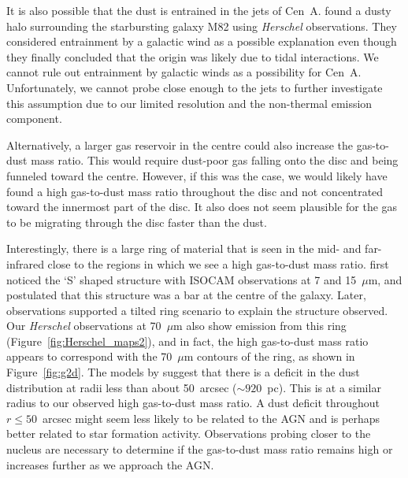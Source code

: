 It is also possible that the dust is entrained in the jets of Cen~A.  \citet{2010A&A...518L..66R} found a dusty halo surrounding the starbursting galaxy M82 using \emph{Herschel} observations.  They considered entrainment by a galactic wind as a possible explanation even though they finally concluded that the origin was likely due to tidal interactions.  We cannot rule out entrainment by galactic winds as a possibility for Cen~A.  Unfortunately, we cannot probe close enough to the jets to further investigate this assumption due to our limited resolution and the non-thermal emission component.

Alternatively, a larger gas reservoir in the centre could also increase the gas-to-dust mass ratio.  This would require dust-poor gas falling onto the disc and being funneled toward the centre.  However, if this was the case, we would likely have found a high gas-to-dust mass ratio throughout the disc and not concentrated toward the innermost part of the disc.  It also does not seem plausible for the gas to be migrating through the disc faster than the dust.

Interestingly, there is a large ring of material that is seen in the mid- and far-infrared close to the regions in which we see a high gas-to-dust mass ratio.  \citet{1999A&A...341..667M} first noticed the `S' shaped structure with ISOCAM observations at 7 and 15~$\mu$m, and postulated that this structure was a bar at the centre of the galaxy.  Later, observations \citep{2002ApJ...565..131L,2006ApJ...645.1092Q} supported a tilted ring scenario to explain the structure observed.  Our \emph{Herschel} observations at 70~$\mu$m also show emission from this ring (Figure~\ref{fig:Herschel_maps2}), and in fact, the high gas-to-dust mass ratio appears to correspond with the 70~$\mu$m contours of the ring, as shown in Figure~\ref{fig:g2d}.  The models by \citet{2006ApJ...645.1092Q} suggest that there is a deficit in the dust distribution at radii less than about 50~arcsec ($\sim 920$~pc).  This is at a similar radius to our observed high gas-to-dust mass ratio.  A dust deficit throughout $r \le 50$~arcsec might seem less likely to be related to the AGN and is perhaps better related to star formation activity.  Observations probing closer to the nucleus are necessary to determine if the gas-to-dust mass ratio remains high or increases further as we approach the AGN.

